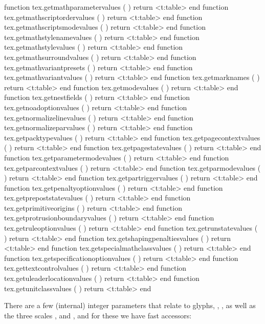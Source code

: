 function tex.getmathparametervalues       ( ) return <t:table> end
function tex.getmathscriptordervalues     ( ) return <t:table> end
function tex.getmathscriptsmodevalues     ( ) return <t:table> end
function tex.getmathstylenamevalues       ( ) return <t:table> end
function tex.getmathstylevalues           ( ) return <t:table> end
function tex.getmathsurroundvalues        ( ) return <t:table> end
function tex.getmathvariantpresets        ( ) return <t:table> end
function tex.getmathvariantvalues         ( ) return <t:table> end
function tex.getmarknames                 ( ) return <t:table> end
function tex.getmodevalues                ( ) return <t:table> end
function tex.getnestfields                ( ) return <t:table> end
function tex.getnoadoptionvalues          ( ) return <t:table> end
function tex.getnormalizelinevalues       ( ) return <t:table> end
function tex.getnormalizeparvalues        ( ) return <t:table> end
function tex.getpacktypevalues            ( ) return <t:table> end
function tex.getpagecontextvalues         ( ) return <t:table> end
function tex.getpagestatevalues           ( ) return <t:table> end
function tex.getparametermodevalues       ( ) return <t:table> end
function tex.getparcontextvalues          ( ) return <t:table> end
function tex.getparmodevalues             ( ) return <t:table> end
function tex.getpartriggervalues          ( ) return <t:table> end
function tex.getpenaltyoptionvalues       ( ) return <t:table> end
function tex.getprepoststatevalues        ( ) return <t:table> end
function tex.getprimitiveorigins          ( ) return <t:table> end
function tex.getprotrusionboundaryvalues  ( ) return <t:table> end
function tex.getruleoptionvalues          ( ) return <t:table> end
function tex.getrunstatevalues            ( ) return <t:table> end
function tex.getshapingpenaltiesvalues    ( ) return <t:table> end
function tex.getspecialmathclassvalues    ( ) return <t:table> end
function tex.getspecificationoptionvalues ( ) return <t:table> end
function tex.gettextcontrolvalues         ( ) return <t:table> end
function tex.getuleaderlocationvalues     ( ) return <t:table> end
function tex.getunitclassvalues           ( ) return <t:table> end
\stoptyping

\stopsubsection

\startsubsection [title={Glyphs}]

There are a few (internal) integer parameters that relate to glyphs, \typ
{\glyphdatafield}, \typ {\glyphstatefield}, \typ {\glyphscriptfield} as well as
the three scales \typ {\glyphscale}, \typ {\glyphxscale} and \typ
{\glyphyscale}, and for these we have fast accessors:

